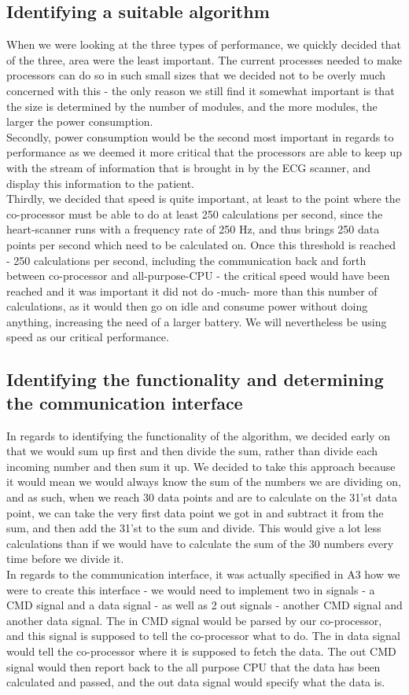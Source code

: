 \documentclass[12pt,a4paper]{article}
\begin{document}
\subsection{Identifying a suitable algorithm}
	When we were looking at the three types of performance, we quickly decided that of the three, area were the least important. The current processes needed to make processors can do so in such small sizes that we decided not to be overly much concerned with this - the only reason we still find it somewhat important is that the size is determined by the number of modules, and the more modules, the larger the power consumption.\\
	Secondly, power consumption would be the second most important in regards to performance as we deemed it more critical that the processors are able to keep up with the stream of information that is brought in by the ECG scanner, and display this information to the patient.\\
	Thirdly, we decided that speed is quite important, at least to the point where the co-processor must be able to do at least 250 calculations per second, since the heart-scanner runs with a frequency rate of 250 Hz, and thus brings 250 data points per second which need to be calculated on. Once this threshold is reached - 250 calculations per second, including the communication back and forth between co-processor and all-purpose-CPU - the critical speed would have been reached and it was important it did not do -much- more than this number of calculations, as it would then go on idle and consume power without doing anything, increasing the need of a larger battery. We will nevertheless be using speed as our critical performance.\\
\subsection{Identifying the functionality and determining the communication interface}
	In regards to identifying the functionality of the algorithm, we decided early on that we would sum up first and then divide the sum, rather than divide each incoming number and then sum it up. We decided to take this approach because it would mean we would always know the sum of the numbers we are dividing on, and as such, when we reach 30 data points and are to calculate on the 31'st data point, we can take the very first data point we got in and subtract it from the sum, and then add the 31'st to the sum and divide. This would give a lot less calculations than if we would have to calculate the sum of the 30 numbers every time before we divide it.\\
	In regards to the communication interface, it was actually specified in A3 how we were to create this interface - we would need to implement two in signals - a CMD signal and a data signal - as well as 2 out signals - another CMD signal and another data signal. The in CMD signal would be parsed by our co-processor, and this signal is supposed to tell the co-processor what to do. The in data signal would tell the co-processor where it is supposed to fetch the data. The out CMD signal would then report back to the all purpose CPU that the data has been calculated and passed, and the out data signal would specify what the data is.
\end{document}
